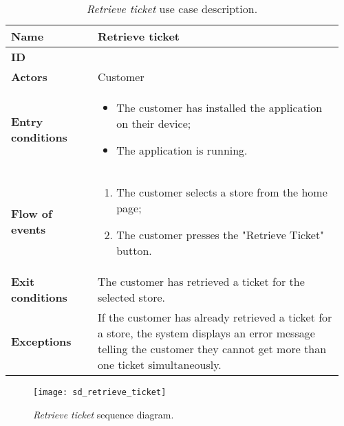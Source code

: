 	\begin{table}[H]
    	\centering
		\begin{tabular}{@{}p{0.25\linewidth}p{0.71\linewidth}@{}}
			\toprule
			\textbf{Name} & Retrieve ticket \\

			\midrule
			\textbf{ID} & \usecaseindex{uc:retrieveTicket} ~\\
			\midrule
			\textbf{Actors} & Customer \\
			\midrule
			\textbf{Entry conditions} &
				\begin{itemize}[leftmargin=.4cm,noitemsep,topsep=0pt,before=\vspace{-3mm},after=\vspace{-4mm}]
					\item The customer has installed the application on their device;
					\item The application is running.
				\end{itemize} \\
			\midrule
			\textbf{Flow of events} &
				\begin{enumerate}[label=\roman*.,leftmargin=.5cm,noitemsep,topsep=0pt,before=\vspace{-3mm},after=\vspace{-4mm}]
					\item The customer selects a store from the home page;
					\item The customer presses the "Retrieve Ticket" button.
				\end{enumerate} \\
			\midrule
			\textbf{Exit conditions} & The customer has retrieved a ticket for the selected store. \\
			\midrule
			\textbf{Exceptions} & If the customer has already retrieved a ticket for a store, the system displays an error message telling the customer they cannot get more than one ticket simultaneously. \\

			\bottomrule
		\end{tabular}
		\caption{\textit{Retrieve ticket} use case description.}
	\end{table}

	\begin{figure}[H]
		\centering
		\texttt{[image: sd\_retrieve\_ticket]}
		\caption{\textit{Retrieve ticket} sequence diagram.}
	\end{figure}


